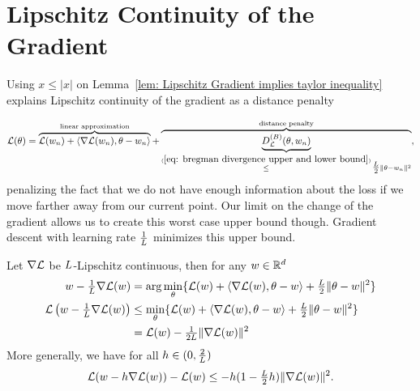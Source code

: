 \section{Lipschitz Continuity of the Gradient}
\label{sec: lipschitz continuity of the Gradient}

Using \(x\le|x|\) on Lemma~\ref{lem: Lipschitz Gradient implies taylor inequality}
explains Lipschitz continuity of the gradient as a distance penalty

\begin{align}\label{eq: lin approx + distance penalty notion}
	\Loss(\theta)
	= \overbrace{
		\Loss(\weights_n)+ \langle\nabla\Loss(\weights_n), \theta-\weights_n\rangle 
	}^{\text{linear approximation}}
	+ \overbrace{\underbrace{\bregmanDiv{\Loss}(\theta,\weights_n)}_{
		\xle{(\ref{eq: bregman divergence upper and lower bound})}
		\tfrac\ubound{2} \|\theta-\weights_n\|^2 
	}}^{\text{distance penalty}},
\end{align}
%
penalizing the fact that we do not have enough information about the loss if we
move farther away from our current point. Our limit on the change of the gradient
allows us to create this worst case upper bound though. Gradient descent
with learning rate \(\frac1{L}\) minimizes this upper bound.
%
\begin{lemma}
	\label{lem: smallest upper bound}
	Let \(\nabla \mathcal{L}\) be \(L\)-Lipschitz continuous, then for any \(w\in\mathbb{R}^d\)
	\begin{align}
		w - \tfrac{1}{L}\nabla \mathcal{L}(w) 
		&= \arg\min_{\theta}\{
			\mathcal{L}(w)+ \langle\nabla \mathcal{L}(w), \theta-w\rangle + \tfrac{L}{2}\|\theta-w\|^2 
		\}\\
		\label{eq: min approximation}
		\mathcal{L}\left(w-\tfrac{1}{L}\nabla\mathcal{L}(w)\right)
		&\le \min_{\theta} \{
			\mathcal{L}(w)+ \langle\nabla \mathcal{L}(w), \theta-w\rangle
			+ \tfrac{L}{2}\|\theta-w\|^2 
		\} \\ \nonumber
		&= \mathcal{L}(w) - \tfrac{1}{2L} \|\nabla \mathcal{L}(w)\|^2
	\end{align}
	More generally, we have for all \(h\in(0, \tfrac{2}{L})\)
	\begin{align*}
		\mathcal{L}(w - h\nabla\mathcal{L}(w)) - \mathcal{L}(w)
		\le-h(1-\tfrac{L}2 h)\|\nabla\mathcal{L}(w)\|^2.
	\end{align*}
\end{lemma}

